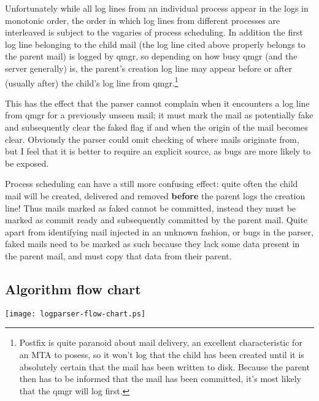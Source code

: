 \documentclass[a4paper,12pt,draft]{article}
\begin{document}
\begin{enumerate}
        Unfortunately while all log lines from an individual process appear
        in the logs in monotonic order, the order in which log lines from
        different processes are interleaved is subject to the vagaries of
        process scheduling.  In addition the first log line belonging to
        the child mail (the log line cited above properly belongs to the
        parent mail) is logged by qmgr, so depending on how busy qmgr (and
        the server generally) is, the parent's creation log line may appear
        before or after (usually after) the child's log line from
        qmgr.\footnote{Postfix is quite paranoid about mail delivery, an
        excellent characteristic for an MTA to posess, so it won't log that
        the child has been created until it is absolutely certain that the
        mail has been written to disk.  Because the parent then has to be
        informed that the mail has been committed, it's most likely that
        the qmgr will log first.}

        This has the effect that the parser cannot complain when it
        encounters a log line from qmgr for a previously unseen mail; it
        must mark the mail as potentially fake and subsequently clear the
        faked flag if and when the origin of the mail becomes clear.
        Obviously the parser could omit checking of where mails originate
        from, but I feel that it is better to require an explicit source,
        as bugs are more likely to be exposed.

        Process scheduling can have a still more confusing effect: quite
        often the child mail will be created, delivered and removed
        \textbf{before} the parent logs the creation line!  Thus mails
        marked as faked cannot be committed, instead they must be marked as
        commit ready and subsequently committed by the parent mail.  Quite
        apart from identifying mail injected in an unknown fashion, or bugs
        in the parser, faked mails need to be marked as such because they
        lack some data present in the parent mail, and must copy that data
        from their parent.


\end{enumerate}

\subsection{Algorithm flow chart}

\texttt{[image: logparser-flow-chart.ps]}
\label{flow-chart}
\end{document}
